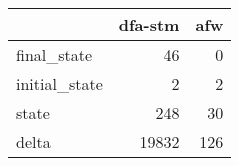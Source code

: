 \begin{tabular}{lrr}
\toprule
{} &  dfa-stm &  afw \\
\midrule
final\_state   &       46 &    0 \\
initial\_state &        2 &    2 \\
state         &      248 &   30 \\
delta         &    19832 &  126 \\
\bottomrule
\end{tabular}

